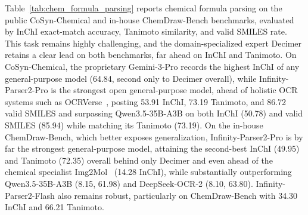 Table~\ref{tab:chem_formula_parsing} reports chemical formula parsing on the public CoSyn-Chemical and in-house ChemDraw-Bench benchmarks, evaluated by InChI exact-match accuracy, Tanimoto similarity, and valid SMILES rate. This task remains highly challenging, and the domain-specialized expert Decimer retains a clear lead on both benchmarks, far ahead on InChI and Tanimoto. On CoSyn-Chemical, the proprietary Gemini-3-Pro records the highest InChI of any general-purpose model (64.84, second only to Decimer overall), while Infinity-Parser2-Pro is the strongest open general-purpose model, ahead of holistic OCR systems such as OCRVerse~\cite{doctron2025ocrverse}, posting 53.91 InChI, 73.19 Tanimoto, and 86.72 valid SMILES and surpassing Qwen3.5-35B-A3B on both InChI (50.78) and valid SMILES (85.94) while matching its Tanimoto (73.19). On the in-house ChemDraw-Bench, which better exposes generalization, Infinity-Parser2-Pro is by far the strongest general-purpose model, attaining the second-best InChI (49.95) and Tanimoto (72.35) overall behind only Decimer and even ahead of the chemical specialist Img2Mol~\cite{clevert2021img2mol} (14.28 InChI), while substantially outperforming Qwen3.5-35B-A3B (8.15, 61.98) and DeepSeek-OCR-2 (8.10, 63.80). Infinity-Parser2-Flash also remains robust, particularly on ChemDraw-Bench with 34.30 InChI and 66.21 Tanimoto.

